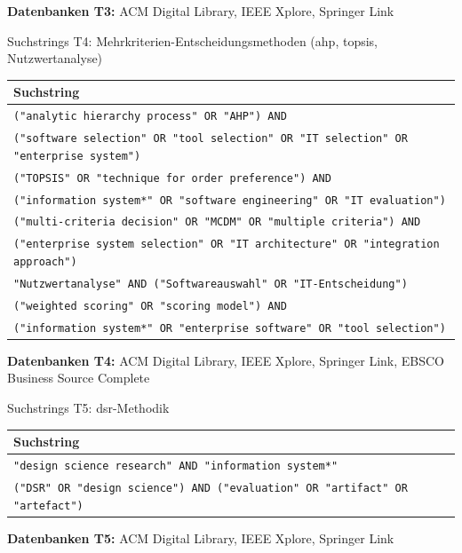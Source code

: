 \noindent\textbf{Datenbanken T3:} ACM Digital Library, IEEE Xplore, Springer Link

\begin{batable}[label=tab:suchstrings-t4]{Suchstrings T4: Mehrkriterien-Entscheidungsmethoden (\gls{ahp}, \gls{topsis}, Nutzwertanalyse)}
\small\setlength{\tabcolsep}{6pt}\renewcommand{\arraystretch}{1.4}
\begin{tabular}{|p{}|}
\hline
\textbf{Suchstring} \\
\hline
\texttt{("analytic hierarchy process" OR "AHP") AND} \\
\texttt{("software selection" OR "tool selection" OR "IT selection" OR "enterprise system")} \\[4pt]
\texttt{("TOPSIS" OR "technique for order preference") AND} \\
\texttt{("information system*" OR "software engineering" OR "IT evaluation")} \\[4pt]
\texttt{("multi-criteria decision" OR "MCDM" OR "multiple criteria") AND} \\
\texttt{("enterprise system selection" OR "IT architecture" OR "integration approach")} \\[4pt]
\texttt{"Nutzwertanalyse" AND ("Softwareauswahl" OR "IT-Entscheidung")} \\[4pt]
\texttt{("weighted scoring" OR "scoring model") AND} \\
\texttt{("information system*" OR "enterprise software" OR "tool selection")} \\
\hline
\end{tabular}
\end{batable}

\noindent\textbf{Datenbanken T4:} ACM Digital Library, IEEE Xplore, Springer Link, EBSCO Business Source Complete

\begin{batable}[label=tab:suchstrings-t5]{Suchstrings T5: \gls{dsr}-Methodik}
\small\setlength{\tabcolsep}{6pt}\renewcommand{\arraystretch}{1.4}
\begin{tabular}{|p{}|}
\hline
\textbf{Suchstring} \\
\hline
\texttt{"design science research" AND "information system*"} \\[4pt]
\texttt{("DSR" OR "design science") AND ("evaluation" OR "artifact" OR "artefact")} \\
\hline
\end{tabular}
\end{batable}

\noindent\textbf{Datenbanken T5:} ACM Digital Library, IEEE Xplore, Springer Link

\endgroup
